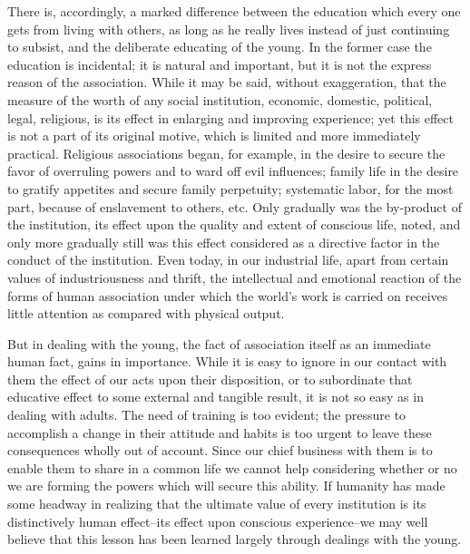 \bigskip
\begin{linenumbers*}
\modulolinenumbers[5]
\indent There is, accordingly, a marked difference between the education which every one gets from living with others, as long as he really lives instead of just continuing to subsist, and the deliberate educating of the young. In the former case the education is incidental; it is natural and important, but it is not the express reason of the association. While it may be said, without exaggeration, that the measure of the worth of any social institution, economic, domestic, political, legal, religious, is its effect in enlarging and improving experience; yet this effect is not a part of its original motive, which is limited and more immediately practical. Religious associations began, for example, in the desire to secure the favor of overruling powers and to ward off evil influences; family life in the desire to gratify appetites and secure family perpetuity; systematic labor, for the most part, because of enslavement to others, etc. Only gradually was the by-product of the institution, its effect upon the quality and extent of conscious life, noted, and only more gradually still was this effect considered as a directive factor in the conduct of the institution. Even today, in our industrial life, apart from certain values of industriousness and thrift, the intellectual and emotional reaction of the forms of human association under which the world's work is carried on receives little attention as compared with physical output.

\indent But in dealing with the young, the fact of association itself as an immediate human fact, gains in importance. While it is easy to ignore in our contact with them the effect of our acts upon their disposition, or to subordinate that educative effect to some external and tangible result, it is not so easy as in dealing with adults. The need of training is too evident; the pressure to accomplish a change in their attitude and habits is too urgent to leave these consequences wholly out of account. Since our chief business with them is to enable them to share in a common life we cannot help considering whether or no we are forming the powers which will secure this ability. If humanity has made some headway in realizing that the ultimate value of every institution is its distinctively human effect--its effect upon conscious experience--we may well believe that this lesson has been learned largely through dealings with the young.


\end{linenumbers*}
